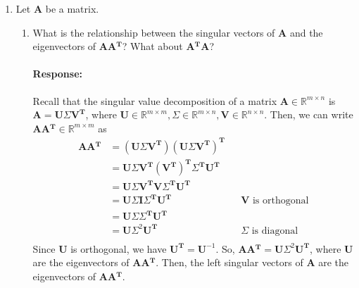 \documentclass [11pt] {article}
\newcommand{\R}{\mathbb{R}}
\newcommand{\T}{\bf{T}}
\newcommand{\A}{\bf{A}}
\newcommand{\U}{\bf{U}}
\newcommand{\V}{\bf{V}}
\newcommand{\AT}{\bf{A$^{\T}$}}
\newenvironment{response}{\vspace{-10pt}\paragraph{Response:}}{}
\renewcommand{\bf}[1]{\textbf{{#1}}}
\begin{document}
\begin{enumerate}
\begin{enumerate}
            \item
                Let $\A$ be a matrix.
                \begin{enumerate}[itemsep=10pt]
                    \item 
                        What is the relationship between the singular vectors of $\A$ and the
                        eigenvectors of $\A \AT$? What about $\AT \A$?
                        \begin{response}
                            Recall that the singular value decomposition of a matrix 
                            $\A \in \R^{m \times n}$ is $\A = \U \Sigma \V^{\T}$, where 
                            $\U \in \R^{m \times m}, \Sigma \in \R^{m \times n}, \V \in \R^{n \times n}$. 
                            Then, we can write $\A \AT \in \R^{m \times m}$ as
                            \begin{align*}
                                \A \AT &= \left( \U \Sigma \V^{\T} \right) \left( \U \Sigma \V^{\T} \right)^{\T} \\
                                       &= \U \Sigma \V^{\T} \left( \V^{\T} \right)^{\T} \Sigma^{\T} \U^{\T} \\
                                       &= \U \Sigma \V^{\T} \V \Sigma^{\T} \U^{\T} \\
                                       &= \U \Sigma \bf{I} \Sigma^{\T} \U^{\T} && \V \text{ is orthogonal} \\
                                       &= \U \Sigma \Sigma^{\T} \U^{\T} \\
                                       &= \U \Sigma^2 \U^{\T} && \Sigma \text{ is diagonal} \\
                            \end{align*}
                            Since $\U$ is orthogonal, we have $\U^{\T} = \U^{-1}$. So,
                            $\A \AT = \U \Sigma^2 \U^{\T}$, where $\U$ are the eigenvectors of 
                            \A \AT. Then, the left singular vectors of $\A$ are the eigenvectors of 
                            \A \AT. \vspace{10pt}


\end{response}
\end{enumerate}
\end{enumerate}
\end{enumerate}
\end{document}
